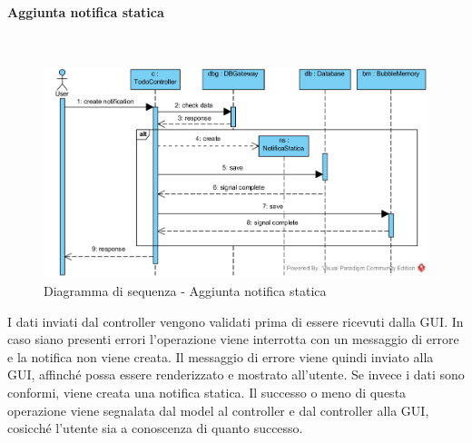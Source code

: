 \begin{samepage}
	\paragraph{Aggiunta notifica statica}\mbox{}\\
\end{samepage}
\begin{figure}[H]
	\centering
	\includegraphics[width=15cm]{../../documenti/SpecificaTecnica/diagrammi_img/sequenza/todo_aggiungi_notifica.png}
	\caption{Diagramma di sequenza - Aggiunta notifica statica}
\end{figure}
I dati inviati dal controller vengono validati prima di essere ricevuti dalla GUI. In caso siano presenti errori l'operazione viene interrotta con un messaggio di errore e la notifica non viene creata. Il messaggio di errore viene quindi inviato alla GUI, affinché possa essere renderizzato e mostrato all'utente. Se invece i dati sono conformi, viene creata una notifica statica. Il successo o meno di questa operazione viene segnalata dal model al controller e dal controller alla GUI, cosicché l'utente sia a conoscenza di quanto successo.

